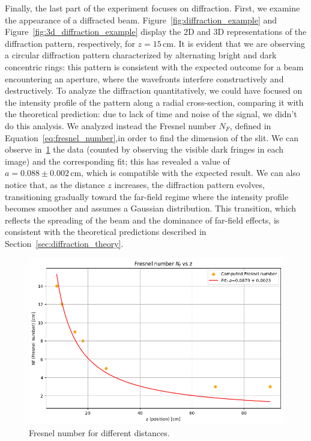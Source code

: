 \documentclass[prl,twocolumn]{revtex4-1}
\begin{document}
Finally, the last part of the experiment focuses on diffraction. First, we examine the appearance of a diffracted beam. Figure~\ref{fig:diffraction_example} and Figure~\ref{fig:3d_diffraction_example} display the 2D and 3D representations of the diffraction pattern, respectively, for $z = 15 \, \text{cm}$. It is evident that we are observing a circular diffraction pattern characterized by alternating bright and dark concentric rings: this pattern is consistent with the expected outcome for a beam encountering an aperture, where the wavefronts interfere constructively and destructively. To analyze the diffraction quantitatively, we could have focused on the intensity profile of the pattern along a radial cross-section, comparing it with the theoretical prediction: due to lack of time and noise of the signal, we didn't do this analysis. We analyzed instead the Fresnel number $N_F$, defined in Equation~\eqref{eq:fresnel_number},in order to find the dimension of the slit. We can observe in~\ref{fig:diffraction_fit} the data (counted by observing the visible dark fringes in each image) and the corresponding fit; this has revealed a value of $a = 0.088 \pm 0.002 \, \text{cm}$, which is compatible with the expected result. We can also notice that, as the distance $z$ increases, the diffraction pattern evolves, transitioning gradually toward the far-field regime where the intensity profile becomes smoother and assumes a Gaussian distribution. This transition, which reflects the spreading of the beam and the dominance of far-field effects, is consistent with the theoretical predictions described in Section~\ref{sec:diffraction_theory}. 

\begin{figure}[!t]
    \centering
    \includegraphics[width=\linewidth]{Images/diffraction_fit.png}
    \caption{Fresnel number for different distances.}
    \label{fig:diffraction_fit}
\end{figure}
\end{document}
